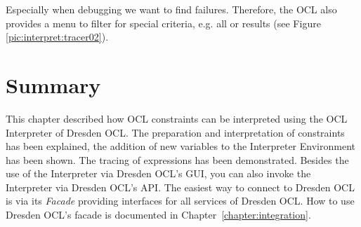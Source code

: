 Especially when debugging we want to find failures. Therefore, the \acs{OCL}  also provides a menu to filter for special criteria, e.g. all  or  results (see Figure \ref{pic:interpret:tracer02}).


\section{Summary}
  
This chapter described how \acs{OCL} constraints can be interpreted using the 
\acs{OCL} Interpreter of Dresden OCL. The preparation and interpretation of 
constraints has been explained, the addition of new variables to the 
Interpreter Environment has been shown. The tracing of expressions has been
demonstrated. Besides the use of the Interpreter via 
Dresden OCL's GUI, you can also invoke the Interpreter via Dresden OCL's 
\acs{API}. The easiest way to connect to Dresden OCL is via its \emph{Facade} 
providing interfaces for all services of Dresden OCL. How to use Dresden OCL's 
facade is documented in Chapter~\ref{chapter:integration}.